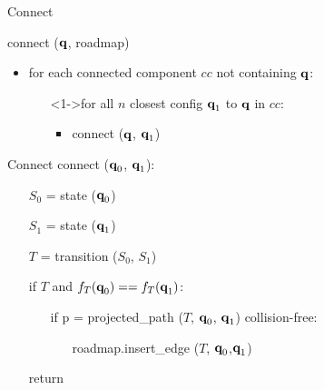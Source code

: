 %
%

\begin {frame} {Connect}

  \begin{block}{connect ($\textbf{q}$, roadmap)}
    \begin{itemize}
    \item <1-> for each connected component $cc$ not containing $\textbf{q}$:
        \begin{itemize}
        \item []<1->for all $n$ closest config $\textbf{q}_1$ to $\textbf{q}$ in $cc$:
          \begin{itemize}
          \item connect ($\textbf{q}$, $\textbf{q}_1$)
          \end{itemize}
        \end{itemize}
    \end{itemize}
  \end{block}
\end {frame}

%
%

\begin {frame} {Connect}
connect ($\textbf{q}_0$, $\textbf{q}_1$):
\begin{itemize}
  \item [] $S_0$ = state ($\textbf{q}_0$)
  \item [] $S_1$ = state ($\textbf{q}_1$)
  \item [] $T$ = transition ($S_0$, $S_1$)
  \item [] if $T$ and $f_{T} (\textbf{q}_0) == f_{T} (\textbf{q}_1)$:
    \begin {itemize}
    \item [] if p = projected\_path ($T$, $\textbf{q}_0$, $\textbf{q}_1$) collision-free:
      \begin {itemize}
        \item [] roadmap.insert\_edge ($T$, $\textbf{q}_0$,$\textbf{q}_1$)
      \end {itemize}
    \end {itemize}
  \item [] return
\end{itemize}

\end {frame}

%
%


